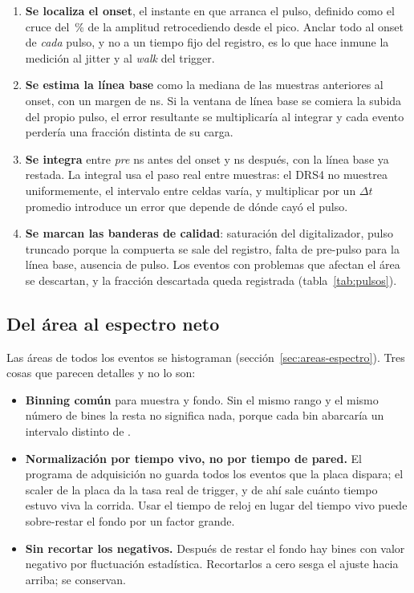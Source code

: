 \documentclass[11pt,a4paper]{article}
\begin{document}
\begin{enumerate}
\item \textbf{Se localiza el onset}, el instante en que arranca el pulso,
      definido como el cruce del \FracOnset\,\% de la amplitud retrocediendo
      desde el pico. Anclar todo al onset de \emph{cada} pulso, y no a un
      tiempo fijo del registro, es lo que hace inmune la medición al jitter y
      al \emph{walk} del trigger.
\item \textbf{Se estima la línea base} como la mediana de las muestras
      anteriores al onset, con un margen de \GuardaBase{} ns. Si la ventana de
      línea base se comiera la subida del propio pulso, el error resultante se
      multiplicaría al integrar y cada evento perdería una fracción distinta
      de su carga.
\item \textbf{Se integra} entre \emph{pre} ns antes del onset y \PostFijo{} ns
      después, con la línea base ya restada. La integral usa el paso real
      entre muestras: el DRS4 no muestrea uniformemente, el intervalo entre
      celdas varía, y multiplicar por un $\Delta t$ promedio introduce un
      error que depende de dónde cayó el pulso.
\item \textbf{Se marcan las banderas de calidad}: saturación del
      digitalizador, pulso truncado porque la compuerta se sale del registro,
      falta de pre-pulso para la línea base, ausencia de pulso. Los eventos
      con problemas que afectan el área se descartan, y la fracción descartada
      queda registrada (tabla~\ref{tab:pulsos}).
\end{enumerate}

\subsection{Del área al espectro neto}

Las áreas de todos los eventos se histograman
(sección~\ref{sec:areas-espectro}). Tres cosas que parecen detalles y no lo
son:

\begin{itemize}
\item \textbf{Binning común} para muestra y fondo. Sin el mismo rango y el
      mismo número de bines la resta no significa nada, porque cada bin
      abarcaría un intervalo distinto de \mVns.
\item \textbf{Normalización por tiempo vivo, no por tiempo de pared.} El
      programa de adquisición no guarda todos los eventos que la placa dispara;
      el scaler de la placa da la tasa real de trigger, y de ahí sale cuánto
      tiempo estuvo viva la corrida. Usar el tiempo de reloj en lugar del
      tiempo vivo puede sobre-restar el fondo por un factor grande.
\item \textbf{Sin recortar los negativos.} Después de restar el fondo hay bines
      con valor negativo por fluctuación estadística. Recortarlos a cero sesga
      el ajuste hacia arriba; se conservan.
\end{itemize}
\end{document}
